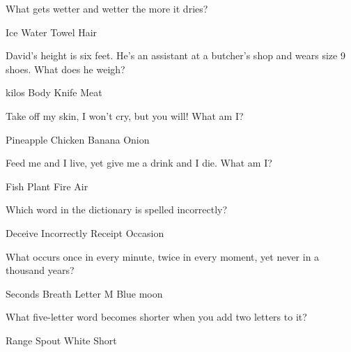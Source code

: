 \begin{questions}
\question What gets wetter and wetter the more it dries?
\begin{multicols}{4}
\begin{choices}  
\choice Ice
\choice Water
\CorrectChoice Towel
\choice Hair
\end{choices}
\end{multicols} 

\question David's height is six feet. He's an assistant at a butcher's shop and wears size 9 shoes. What does he weigh?
\begin{multicols}{4}
\begin{choices}  
 kilos
\choice Body
\choice Knife 
\CorrectChoice Meat
\end{choices}
\end{multicols}

\question Take off my skin, I won't cry, but you will! What am I? 
\begin{multicols}{4}
\begin{choices}  
\choice Pineapple 
\choice Chicken 
\choice Banana 
\CorrectChoice Onion
\end{choices}
\end{multicols} 

\question Feed me and I live, yet give me a drink and I die. What am I? 
\begin{multicols}{4}
\begin{choices}  
\choice Fish
\choice Plant
\CorrectChoice Fire
\choice Air
\end{choices}
\end{multicols} 

\question Which word in the dictionary is spelled incorrectly? 
\begin{multicols}{4}
\begin{choices}  
\choice Deceive 
\CorrectChoice Incorrectly
\choice Receipt 
\choice Occasion 
\end{choices}
\end{multicols}

\question What occurs once in every minute, twice in every moment, yet never in a thousand years? 
\begin{multicols}{4}
\begin{choices}  
\choice Seconds 
\choice Breath 
\CorrectChoice Letter M
\choice Blue moon 
\end{choices}
\end{multicols}

\question What five-letter word becomes shorter when you add two letters to it? 
\begin{multicols}{4}
\begin{choices}  
\choice Range
\choice Spout
\choice White
\CorrectChoice Short
\end{choices}
\end{multicols}


\end{questions}
